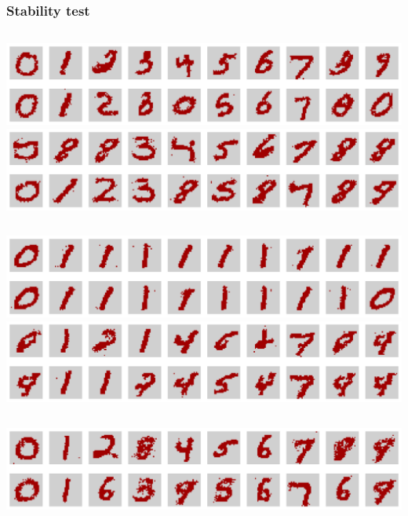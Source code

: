 \begin{frame}
  \frametitle{Stability test}
  \begin{columns}
      \centering
      \includegraphics[width=\textwidth]{img/numerical-experiments/stability-cd-1.pdf}
    \centering
      \includegraphics[width=\linewidth]{img/numerical-experiments/stability-pcd-1.pdf}
  \end{columns}
  \vspace{5pt}
  \begin{columns}
    \centering
    \includegraphics[width=\textwidth]{img/numerical-experiments/stability-mf-3.pdf}
    \centering
    \includegraphics[width=\linewidth]{img/numerical-experiments/stability-pmf-3.pdf}
  \end{columns}
  \vspace{5pt}
  \begin{columns}
    \centering
    \includegraphics[width=\textwidth]{img/numerical-experiments/stability-tap2-3.pdf}

\end{columns}
\end{frame}
